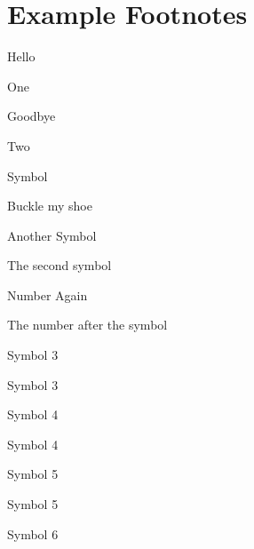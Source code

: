 \documentclass[letterpaper,10pt,english]{sphinxmanual}
\newcommand\thesymbolfootnote{\fnsymbol{footnote}}\let\thenumberfootnote\thefootnote
\begin{document}
\section{Example Footnotes}
\label{\detokenize{latex:example-footnotes}}
\begin{DUlineblock}{0em}
\item[] Hello %
\begin{footnote}[1]\sphinxAtStartFootnote
One
%
\end{footnote}\renewcommand\thefootnote{\thenumberfootnote}
\item[] Goodbye %
\begin{footnote}[2]\sphinxAtStartFootnote
Two
%
\end{footnote}\renewcommand\thefootnote{\thenumberfootnote}
\item[] Symbol %
\renewcommand\thefootnote{\thesymbolfootnote}\begin{footnote}[2]\sphinxAtStartFootnote
Buckle my shoe
%
\end{footnote}\renewcommand\thefootnote{\thenumberfootnote}
\item[] Another Symbol %
\renewcommand\thefootnote{\thesymbolfootnote}\begin{footnote}[3]\sphinxAtStartFootnote
The second symbol
%
\end{footnote}\renewcommand\thefootnote{\thenumberfootnote}
\item[] Number Again %
\begin{footnote}[3]\sphinxAtStartFootnote
The number after the symbol
%
\end{footnote}\renewcommand\thefootnote{\thenumberfootnote}
\item[] Symbol 3 %
\renewcommand\thefootnote{\thesymbolfootnote}\begin{footnote}[4]\sphinxAtStartFootnote
Symbol 3
%
\end{footnote}\renewcommand\thefootnote{\thenumberfootnote}
\item[] Symbol 4 %
\renewcommand\thefootnote{\thesymbolfootnote}\begin{footnote}[5]\sphinxAtStartFootnote
Symbol 4
%
\end{footnote}\renewcommand\thefootnote{\thenumberfootnote}
\item[] Symbol 5 %
\renewcommand\thefootnote{\thesymbolfootnote}\begin{footnote}[6]\sphinxAtStartFootnote
Symbol 5
%
\end{footnote}\renewcommand\thefootnote{\thenumberfootnote}
\item[] Symbol 6 %

\end{DUlineblock}
\end{document}
